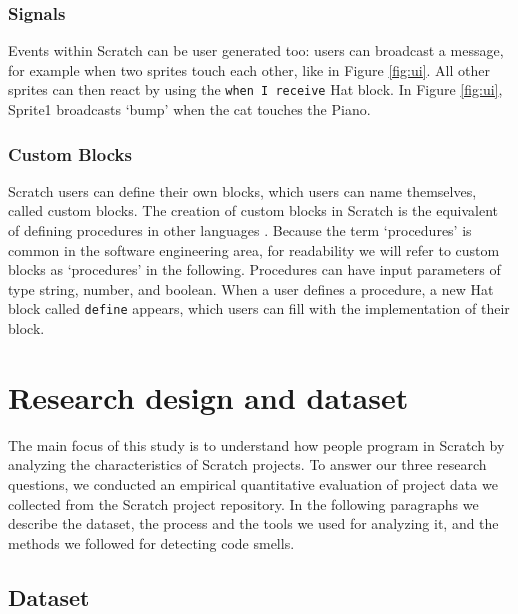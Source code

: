 \documentclass{sig-alternate}
\begin{document}
\subsubsection{Signals}
Events within Scratch can be user generated too: users can broadcast a message, for example when two sprites touch each other, like in Figure \ref{fig:ui}. All other sprites can then react by using the \texttt{when I receive} Hat block. In Figure \ref{fig:ui}, Sprite1 broadcasts `bump' when the cat touches the Piano. 

\subsubsection{Custom Blocks}
Scratch users can define their own blocks, which users can name themselves, called custom blocks. The creation of custom blocks in Scratch is the equivalent of defining procedures in other languages \cite{moreno_automatic_2014}. Because the term `procedures' is common in the software engineering area, for readability we will refer to custom blocks as `procedures' in the following. Procedures can have input parameters of type string, number, and boolean. When a user defines a procedure, a new Hat block called \texttt{define} appears, which users can fill with the implementation of their block.




\section{Research design and dataset}
\label{researchDesign}

The main focus of this study is to understand how people program in Scratch by analyzing the characteristics of Scratch projects. To answer our three research questions, we conducted an empirical quantitative evaluation of project data we collected from the Scratch project repository. In the following paragraphs we describe the dataset, the  process and the tools we used for analyzing it, and the methods we followed for detecting code smells.

\subsection{Dataset}
\label{dataset}
\end{document}
